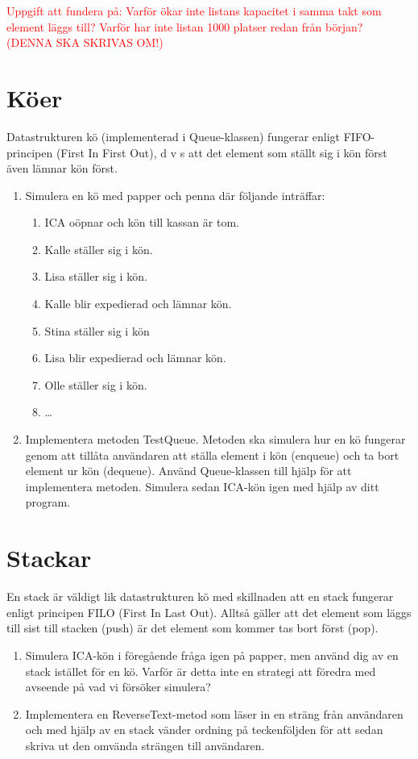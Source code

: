 \documentclass{article}
\begin{document}
  \textcolor{red}{Uppgift att fundera på: Varför ökar inte listans kapacitet i samma takt som element läggs till? Varför har inte listan 1000 platser redan från början? (DENNA SKA SKRIVAS OM!)}

  \section*{Köer}
  Datastrukturen kö (implementerad i Queue-klassen) fungerar enligt FIFO-principen (First
  In First Out), d v s att det element som ställt sig i kön först även lämnar kön först.

  \begin{enumerate}
      \item Simulera en kö med papper och penna där följande inträffar:
	      \begin{enumerate}
	          \item ICA oöpnar och kön till kassan är tom.
	          \item Kalle ställer sig i kön.
	          \item Lisa ställer sig i kön.
	          \item Kalle blir expedierad och lämnar kön.
	          \item Stina ställer sig i kön
	          \item Lisa blir expedierad och lämnar kön.
	          \item Olle ställer sig i kön.
	          \item \ldots
	      \end{enumerate}
      \item Implementera metoden TestQueue. Metoden ska simulera hur en kö fungerar genom
      att tillåta användaren att ställa element i kön (enqueue) och ta bort element ur kön
      (dequeue). Använd Queue-klassen till hjälp för att implementera metoden. Simulera
      sedan ICA-kön igen med hjälp av ditt program.
    \end{enumerate}
  \section*{Stackar}
  En stack är väldigt lik datastrukturen kö med skillnaden att en stack fungerar enligt principen FILO (First In Last Out). Alltså gäller att det element som läggs till sist till stacken (push) är det element som kommer tas bort först (pop).
  \begin{enumerate}
  	          \item Simulera ICA-kön i föregående fråga igen på papper, men använd dig av en stack istället för en kö. Varför är detta inte en strategi att föredra med avseende på vad vi försöker simulera?
  	          \item Implementera en ReverseText-metod som läser in en sträng från användaren och med hjälp av en stack vänder ordning på teckenföljden för att sedan skriva ut den omvända strängen till användaren.	          
   \end{enumerate}
   \newpage
\end{document}
